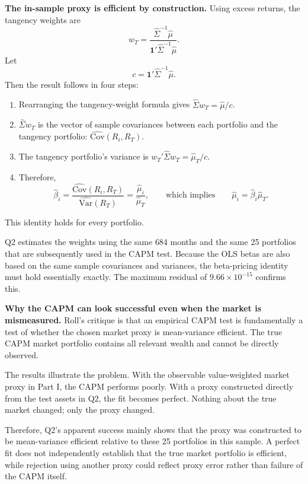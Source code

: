 \documentclass[11pt]{article}
\begin{document}
\textbf{The in-sample proxy is efficient by construction.} Using excess
returns, the tangency weights are
\[
w_T = \frac{\hat\Sigma^{-1}\hat\mu}{\mathbf{1}'\hat\Sigma^{-1}\hat\mu}.
\]
Let
\[
c = \mathbf{1}'\hat\Sigma^{-1}\hat\mu.
\]
Then the result follows in four steps:
\begin{enumerate}\setlength{\itemsep}{2pt}\setlength{\topsep}{3pt}
\item Rearranging the tangency-weight formula gives
$\hat\Sigma w_T = \hat\mu / c$.
\item $\hat\Sigma w_T$ is the vector of sample covariances between each
portfolio and the tangency portfolio:
$\widehat{\mathrm{Cov}}(R_i, R_T)$.
\item The tangency portfolio's variance is
$w_T'\hat\Sigma w_T = \hat\mu_T / c$.
\item Therefore,
\[
\hat\beta_i = \frac{\widehat{\mathrm{Cov}}(R_i, R_T)}
{\widehat{\mathrm{Var}}(R_T)} = \frac{\hat\mu_i}{\hat\mu_T},
\qquad\text{which implies}\qquad
\hat\mu_i = \hat\beta_i \hat\mu_T .
\]
\end{enumerate}
This identity holds for every portfolio.

Q2 estimates the weights using the same 684 months and the same 25 portfolios
that are subsequently used in the CAPM test. Because the OLS betas are also
based on the same sample covariances and variances, the beta-pricing identity
must hold essentially exactly. The maximum residual of $9.66\times10^{-15}$
confirms this.

\textbf{Why the CAPM can look successful even when the market is mismeasured.}
Roll's critique is that an empirical CAPM test is fundamentally a test of
whether the chosen market proxy is mean-variance efficient. The true CAPM
market portfolio contains all relevant wealth and cannot be directly observed.

The results illustrate the problem. With the observable value-weighted market
proxy in Part I, the CAPM performs poorly. With a proxy constructed directly
from the test assets in Q2, the fit becomes perfect. Nothing about the true
market changed; only the proxy changed.

Therefore, Q2's apparent success mainly shows that the proxy was constructed to
be mean-variance efficient relative to these 25 portfolios in this sample. A
perfect fit does not independently establish that the true market portfolio is
efficient, while rejection using another proxy could reflect proxy error rather
than failure of the CAPM itself.
\end{document}
